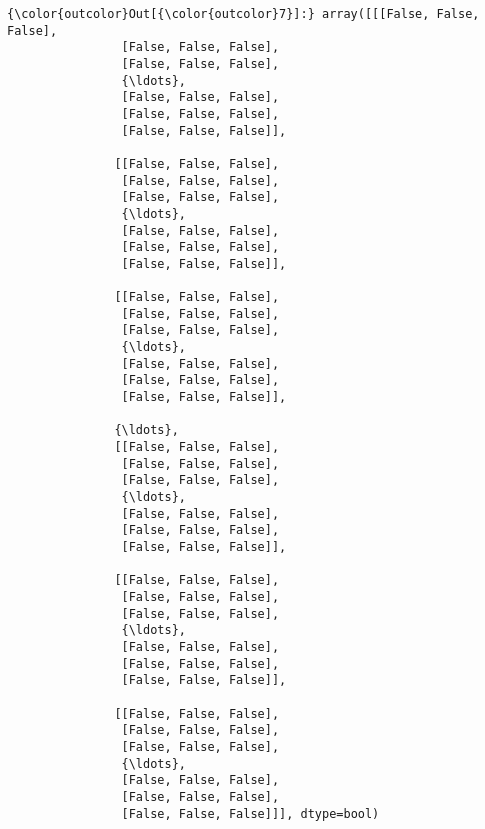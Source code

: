 \documentclass[11pt]{article}
\begin{document}
\begin{Verbatim}[commandchars=\\\{\}]
{\color{outcolor}Out[{\color{outcolor}7}]:} array([[[False, False, False],
                [False, False, False],
                [False, False, False],
                {\ldots}, 
                [False, False, False],
                [False, False, False],
                [False, False, False]],
        
               [[False, False, False],
                [False, False, False],
                [False, False, False],
                {\ldots}, 
                [False, False, False],
                [False, False, False],
                [False, False, False]],
        
               [[False, False, False],
                [False, False, False],
                [False, False, False],
                {\ldots}, 
                [False, False, False],
                [False, False, False],
                [False, False, False]],
        
               {\ldots}, 
               [[False, False, False],
                [False, False, False],
                [False, False, False],
                {\ldots}, 
                [False, False, False],
                [False, False, False],
                [False, False, False]],
        
               [[False, False, False],
                [False, False, False],
                [False, False, False],
                {\ldots}, 
                [False, False, False],
                [False, False, False],
                [False, False, False]],
        
               [[False, False, False],
                [False, False, False],
                [False, False, False],
                {\ldots}, 
                [False, False, False],
                [False, False, False],
                [False, False, False]]], dtype=bool)
\end{Verbatim}
            
\end{document}
